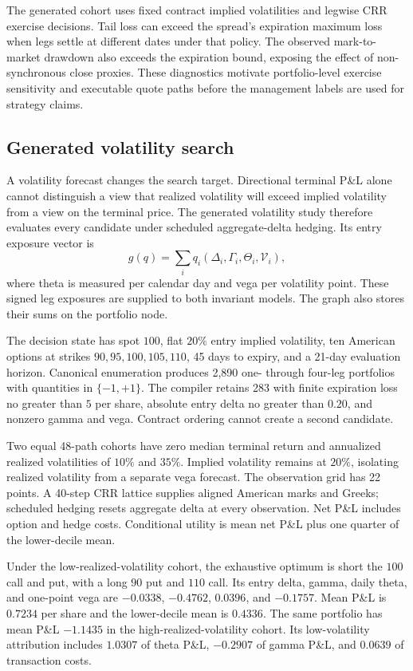\documentclass{strategynet-journal}
\begin{document}
The generated cohort uses fixed contract implied volatilities and legwise CRR
exercise decisions.  Tail loss can exceed the spread's expiration maximum
loss when legs settle at different dates under that policy.  The observed
mark-to-market drawdown also exceeds the expiration bound, exposing the
effect of non-synchronous close proxies.  These diagnostics motivate
portfolio-level exercise sensitivity and executable quote paths before the
management labels are used for strategy claims.

\subsection{Generated volatility search}
\label{sec:generated-volatility}

A volatility forecast changes the search target.  Directional terminal P\&L
alone cannot distinguish a view that realized volatility will exceed implied
volatility from a view on the terminal price.  The generated volatility study
therefore evaluates every candidate under scheduled aggregate-delta hedging.
Its entry exposure vector is
\[
  g(q)=\sum_i q_i
  \left(\Delta_i,\Gamma_i,\Theta_i,\mathcal V_i\right),
\]
where theta is measured per calendar day and vega per volatility point.
These signed leg exposures are supplied to both invariant models.  The graph
also stores their sums on the portfolio node.

The decision state has spot \(100\), flat \(20\%\) entry implied volatility,
ten American options at strikes \(90,95,100,105,110\), 45 days to expiry, and
a 21-day evaluation horizon.  Canonical enumeration produces 2,890
one- through four-leg portfolios with quantities in \(\{-1,+1\}\).
The compiler retains 283 with finite expiration loss no greater than \(5\)
per share, absolute entry delta no greater than \(0.20\), and nonzero gamma
and vega.  Contract ordering cannot create a second candidate.

Two equal 48-path cohorts have zero median terminal return and annualized
realized volatilities of \(10\%\) and \(35\%\).  Implied volatility remains
at \(20\%\), isolating realized volatility from a separate vega forecast.
The observation grid has 22 points.  A 40-step CRR lattice supplies aligned
American marks and Greeks; scheduled hedging resets aggregate delta at every
observation.  Net P\&L includes option and hedge costs.  Conditional utility
is mean net P\&L plus one quarter of the lower-decile mean.

Under the low-realized-volatility cohort, the exhaustive optimum is short the
\(100\) call and put, with a long \(90\) put and \(110\) call.  Its entry
delta, gamma, daily theta, and one-point vega are \(-0.0338\), \(-0.4762\),
\(0.0396\), and \(-0.1757\).  Mean P\&L is \(0.7234\) per share and the
lower-decile mean is \(0.4336\).  The same portfolio has mean P\&L
\(-1.1435\) in the high-realized-volatility cohort.  Its low-volatility
attribution includes \(1.0307\) of theta P\&L, \(-0.2907\) of gamma P\&L,
and \(0.0639\) of transaction costs.
\end{document}
